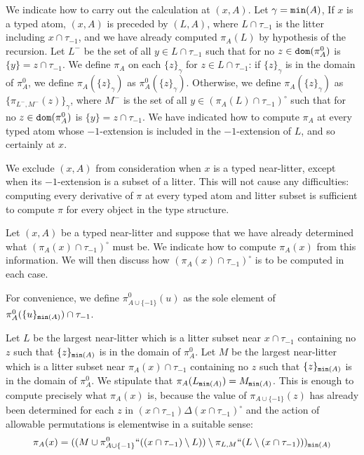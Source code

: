 \documentclass[112pt]{article}
\begin{document}
\begin{description}
We indicate how to carry out the calculation at $(x,A)$.  Let $\gamma = {\tt min}(A)$,  If $x$ is a typed atom, $(x,A)$ is preceded by $(L,A)$, where $L \cap \tau_{-1}$
is the litter including $x \cap \tau_{-1}$, and we have already computed $\pi_A(L)$ by hypothesis of the recursion.  Let $L^-$ be the set of all $y\in L \cap \tau_{-1}$ such that for no $z \in {\tt dom}(\pi^0_A)$ is $\{y\}= z \cap \tau_{-1}$.  We define $\pi_{A}$ on each $\{z\}_\gamma$ for $z \in L \cap \tau_{-1}$:
if $\{z\}_\gamma$ is in the domain of $\pi^0_A$, we define $\pi_A(\{z\}_\gamma)$ as $\pi^0_A(\{z\}_\gamma)$.  Otherwise, we define
$\pi_A(\{z\}_\gamma)$ as $\{\pi_{L^-,M^-}(z)\}_\gamma$, where $M^-$ is the set of all $y\in (\pi_A(L) \cap \tau_{-1})^\circ$ such that for no $z \in {\tt dom}(\pi^0_A)$ is $\{y\}=z \cap \tau_{-1}$.   We have indicated how to compute $\pi_A$ at every typed atom whose $-1$-extension is included in the $-1$-extension of $L$, and so certainly at $x$.

We exclude $(x,A)$ from consideration when $x$ is a typed near-litter, except when its $-1$-extension is a subset of a litter.  This will not cause
any difficulties:  computing every derivative of $\pi$ at every typed atom and litter subset is sufficient to compute $\pi$ for every object in the type structure.

Let $(x,A)$ be a typed near-litter and suppose that we have already determined what $(\pi_A(x) \cap \tau_{-1})^\circ$ must be.   We indicate how
to compute $\pi_A(x)$ from this information.  We will then discuss how $(\pi_A(x) \cap \tau_{-1})^\circ$  is to be computed in each case.

For convenience, we define $\pi^0_{A \cup \{-1\}}(u)$ as the sole element of  $\pi^0_A(\{u\}_{{\tt min}(A)}) \cap \tau_{-1}$.

Let $L$ be the largest near-litter which is a litter subset near $x \cap \tau_{-1}$ containing no $z$ such that $\{z\}_{{\tt min}(A)}$ is in the domain of $\pi^0_A$.
Let $M$ be the largest  near-litter which is a litter subset near $\pi_A(x) \cap \tau_{-1}$ containing no $z$ such that $\{z\}_{{\tt min}(A)}$ is in the domain of $\pi^0_A$.
We stipulate that $\pi_A(L_{{\tt min}(A)}) = M_{{\tt min}(A)}$.  This is enough to compute precisely what $\pi_A(x)$ is, because
the value of $\pi_{A \cup \{-1\}}(z)$ has already been determined for each $z$ in $(x \cap \tau_{-1}) \Delta (x \cap \tau_{-1})^\circ$ and the action of allowable permutations is elementwise in a suitable sense:  $$\pi_A(x) = ((M \cup \pi^0_{A \cup \{-1\}}``((x\cap \tau_{-1}) \setminus L)) \setminus \pi_{L,M}``(L\setminus (x\cap \tau_{-1})))_{{\tt min}(A)}$$


\end{description}
\end{document}
